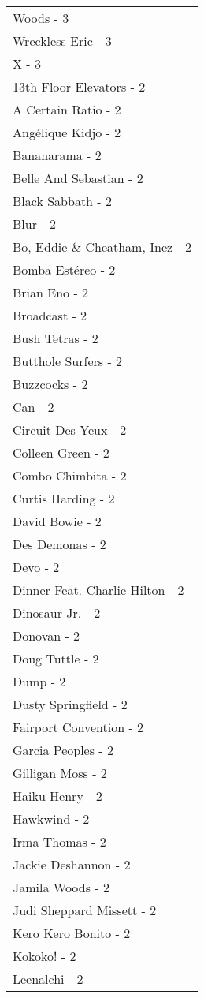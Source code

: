 \documentclass[
]{article}
\begin{document}
\begin{longtable}{l}
Woods - 3 \\ 
Wreckless Eric - 3 \\ 
X - 3 \\ 
13th Floor Elevators - 2 \\ 
A Certain Ratio - 2 \\ 
Angélique Kidjo - 2 \\ 
Bananarama - 2 \\ 
Belle And Sebastian - 2 \\ 
Black Sabbath - 2 \\ 
Blur - 2 \\ 
Bo, Eddie \& Cheatham, Inez - 2 \\ 
Bomba Estéreo - 2 \\ 
Brian Eno - 2 \\ 
Broadcast - 2 \\ 
Bush Tetras - 2 \\ 
Butthole Surfers - 2 \\ 
Buzzcocks - 2 \\ 
Can - 2 \\ 
Circuit Des Yeux - 2 \\ 
Colleen Green - 2 \\ 
Combo Chimbita - 2 \\ 
Curtis Harding - 2 \\ 
David Bowie - 2 \\ 
Des Demonas - 2 \\ 
Devo - 2 \\ 
Dinner Feat. Charlie Hilton - 2 \\ 
Dinosaur Jr. - 2 \\ 
Donovan - 2 \\ 
Doug Tuttle - 2 \\ 
Dump - 2 \\ 
Dusty Springfield - 2 \\ 
Fairport Convention - 2 \\ 
Garcia Peoples - 2 \\ 
Gilligan Moss - 2 \\ 
Haiku Henry - 2 \\ 
Hawkwind - 2 \\ 
Irma Thomas - 2 \\ 
Jackie Deshannon - 2 \\ 
Jamila Woods - 2 \\ 
Judi Sheppard Missett - 2 \\ 
Kero Kero Bonito - 2 \\ 
Kokoko! - 2 \\ 
Leenalchi - 2 \\ 

\end{longtable}
\end{document}
